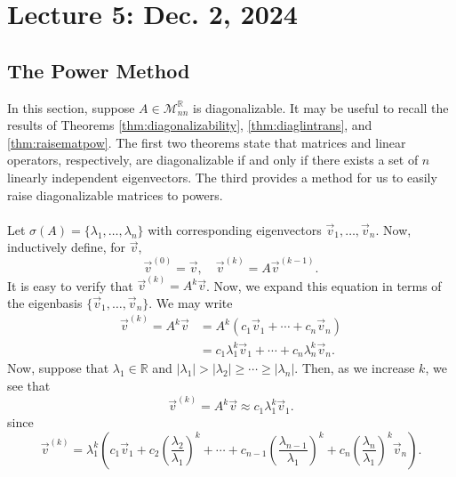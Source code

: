 \pagebreak

\section{Lecture 5: Dec. 2, 2024}

    \subsection{The Power Method}

        In this section, suppose \(A\in\mathcal{M}_{nn}^{\mathbb{R}}\) is diagonalizable. It may be useful to recall the results of Theorems \ref{thm:diagonalizability}, \ref{thm:diaglintrans}, and \ref{thm:raisematpow}. The first two theorems state that matrices and linear operators, respectively, are diagonalizable if and only if there exists a set of \(n\) linearly independent eigenvectors. The third provides a method for us to easily raise diagonalizable matrices to powers.
        \\
        \\
        Let \(\sigma(A)=\{\lambda_1,\ldots,\lambda_n\}\) with corresponding eigenvectors \(\vec{v}_1,\ldots,\vec{v}_n\). Now, inductively define, for \(\vec{v}\), 
        \begin{equation*}
            \vec{v}^{(0)}=\vec{v},\quad \vec{v}^{(k)}=A\vec{v}^{(k-1)}.
        \end{equation*}
        It is easy to verify that \(\vec{v}^{(k)}=A^k\vec{v}\). Now, we expand this equation in terms of the eigenbasis \(\{\vec{v}_1,\ldots,\vec{v}_n\}\). We may write
        \begin{align*}
            \vec{v}^{(k)}=A^k\vec{v}&=A^k(c_1\vec{v}_1+\cdots+c_n\vec{v}_n) \\
            &=c_1\lambda_1^k\vec{v}_1+\cdots+c_n\lambda_n^k\vec{v}_n.
        \end{align*}
        Now, suppose that \(\lambda_1\in\mathbb{R}\) and \(|\lambda_1|>|\lambda_2|\geq\cdots\geq|\lambda_n|\). Then, as we increase \(k\), we see that
        \begin{equation*}
            \vec{v}^{(k)}=A^k\vec{v}\approx c_1\lambda_1^k\vec{v}_1.
        \end{equation*}
        since
        \begin{equation*}
            \vec{v}^{(k)}=\lambda_1^k\left(c_1\vec{v}_1+c_2\left(\frac{\lambda_2}{\lambda_1}\right)^k+\cdots+c_{n-1}\left(\frac{\lambda_{n-1}}{\lambda_1}\right)^k+c_n\left(\frac{\lambda_n}{\lambda_1}\right)^k\vec{v}_n\right).
        \end{equation*}
